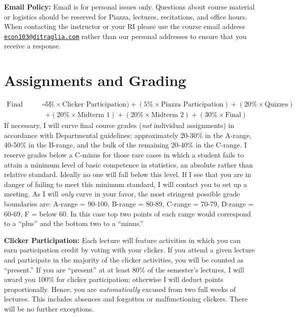 \documentclass[11pt, letterpaper]{article}
\begin{document}
\bigskip

\noindent \textbf{Email Policy:} 
Email is for personal issues only. Questions about course material or logistics should be reserved for Piazza, lectures, recitations, and office hours. 
When contacting the instructor or your RI please use the course email address \href{mailto:econ103@ditraglia.com}{\texttt{econ103@ditraglia.com}} rather than our personal addresses to ensure that you receive a response.

\newpage

\section*{Assignments and Grading}
	\begin{equation*}
	\begin{split}
		\mbox{Final Grade} = (&5\% \times \mbox{Clicker Participation}) + (5\% \times \mbox{Piazza Participation}) + (20\% \times \mbox{Quizzes})  \\ &
							 + (20\% \times \mbox{Midterm 1}) + (20\% \times \mbox{Midterm 2}) + (30\% \times \mbox{Final})
	\end{split}
	\end{equation*}
If necessary, I will curve final course grades (\emph{not} individual assignments) in accordance with Departmental guidelines: approximately 20-30\% in the A-range, 40-50\% in the B-range, and the bulk of the remaining 20-40\% in the C-range. 
I reserve grades below a C-minus for those rare cases in which a student fails to attain a minimum level of basic competence in statistics, an absolute rather than relative standard. 
Ideally no one will fall below this level. 
If I see that you are in danger of failing to meet this minimum standard, I will contact you to set up a meeting. 
As I will \emph{only} curve in your favor, the most stringent possible grade boundaries are: A-range = 90-100, B-range = 80-89, C-range = 70-79, D-range = 60-69, F = below 60. 
In this case top two points of each range would correspond to a ``plus'' and the bottom two to a ``minus.'' 

\medskip


\noindent \textbf{Clicker Participation:} 
Each lecture will feature activities in which you can earn participation credit by voting with your clicker. 
If you attend a given lecture and participate in the majority of the clicker activities, you will be counted as ``present.'' 
If you are ``present'' at at least 80\% of the semester's lectures, I will award you 100\% for clicker participation; otherwise I will deduct points proportionally. 
Hence, you are \emph{automatically} excused from two full weeks of lectures. 
This includes absences and forgotten or malfunctioning clickers. There will be no further exceptions.
\end{document}
